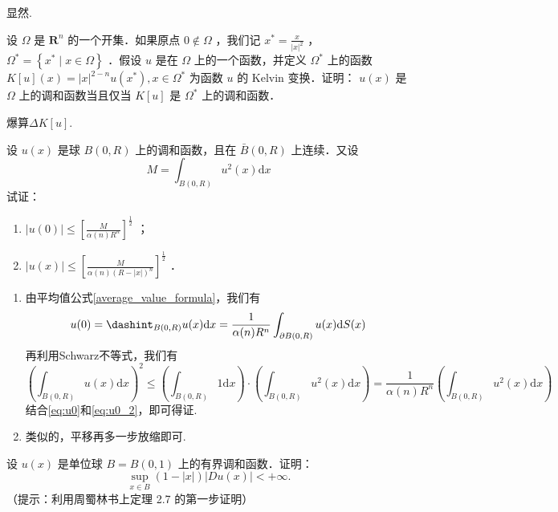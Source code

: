 \documentclass{mynote}
\begin{document}
显然.

\begin{exercise}
    设 $\Omega$ 是 $\mathbf{R}^n$ 的一个开集．如果原点 $0 \notin \Omega$ ，我们记 $x^*=\frac{x}{|x|^2}$ ， $\Omega^*=\left\{x^* \mid x \in \Omega\right\}$ ．假设 $u$ 是在 $\Omega$ 上的一个函数，并定义 $\Omega^*$ 上的函数 $K[u](x)=|x|^{2-n} u\left(x^*\right), x \in \Omega^*$ 为函数 $u$ 的 Kelvin 变换．证明： $u(x)$ 是 $\Omega$ 上的调和函数当且仅当 $K[u]$ 是 $\Omega^*$ 上的调和函数．
\end{exercise}

爆算$\Delta K[u]$.

\begin{exercise}
    设 $u(x)$ 是球 $B(0, R)$ 上的调和函数，且在 $\bar{B}(0, R)$ 上连续．又设
$$
M=\int_{B(0, R)} u^2(x) \mathrm{d} x
$$
试证：
\begin{enumerate}   
    \item $|u(0)| \leq\left[\frac{M}{\alpha(n) R^n}\right]^{\frac{1}{2}}$ ；
    \item $|u(x)| \leq\left[\frac{M}{\alpha(n)(R-|x|)^n}\right]^{\frac{1}{2}}$ ．
\end{enumerate}
\end{exercise}
\begin{enumerate}
    \item 由平均值公式\ref{average_value_formula}，我们有
    \begin{equation}\label{eq:u0}
    u(0)=\dashint_{ B(0,R)}u(x)\mathrm{d}x=\frac{1}{\alpha(n)R^{n}}\int_{\partial B(0,R)}u(x)\mathrm{d}S(x)
\end{equation}
再利用Schwarz不等式，我们有
\begin{equation}\label{eq:u0_2} 
    \left( \int_{B(0,R)}u(x)\mathrm{d}x\right)^2\le \left( \int_{B(0,R)}1 \mathrm{d}x\right)\cdot \left( \int_{B(0,R)}u^2(x)\mathrm{d}x\right)=\frac{1}{\alpha(n)R^{n}}\left( \int_{B(0,R)}u^2(x)\mathrm{d}x\right)
\end{equation}
结合\ref{eq:u0}和\ref{eq:u0_2}，即可得证.
    \item 类似的，平移再多一步放缩即可.
\end{enumerate}

\begin{exercise}
    设 $u(x)$ 是单位球 $B=B(0,1)$ 上的有界调和函数．证明：
$$
\sup _{x \in B}(1-|x|)|D u(x)|<+\infty .
$$
（提示：利用周蜀林书上定理 2.7 的第一步证明）
\end{exercise}
\end{document}
